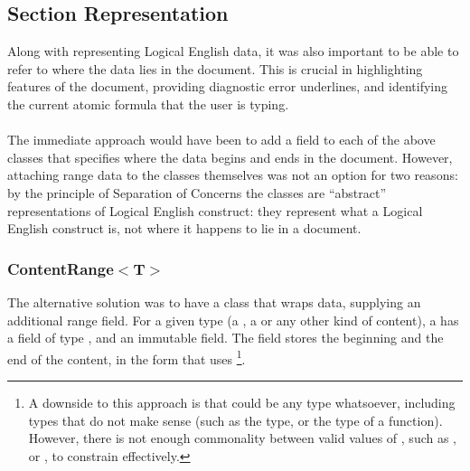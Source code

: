 \documentclass[../main.tex]{subfiles}
\begin{document}

\subsection{Section Representation}
Along with representing Logical English data, it was also important to be able to refer to where the data lies in the document. This is crucial in highlighting features of the document, providing diagnostic error underlines, and identifying the current atomic formula that the user is typing. 
\\
\\
The immediate approach would have been to add a  field to each of the above classes that specifies where the data begins and ends in the document. However, attaching range data to the classes themselves was not an option for two reasons: by the principle of Separation of Concerns \cite[p.~183]{software_handbook_soc} the classes are ``abstract'' representations of Logical English construct: they represent what a Logical English construct is, not where it happens to lie in a document. 

\subsubsection{ContentRange$<$T$>$}
The alternative solution was to have a class that wraps data, supplying an additional range field. For a given type  (a , a  or any other kind of content), a  has a  field of type , and an immutable  field. 
The  field stores the beginning and the end of the content, in the  form that  uses \footnote{A downside to this approach is that  could be any type whatsoever, including types that do not make sense (such as the  type, or the type of a function). However, there is not enough commonality between valid values of , such as ,  or , to constrain  effectively.}.
\end{document}
